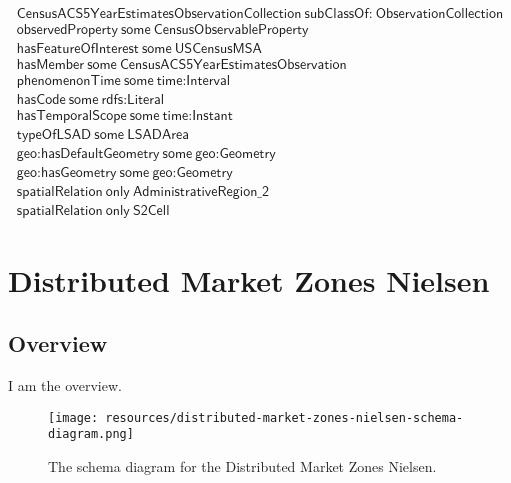 \begin{align}
  \textsf{CensusACS5YearEstimatesObservationCollection}~\textsf{subClassOf:}~\textsf{ObservationCollection}\\
  \textsf{observedProperty}~\textsf{some}~\textsf{CensusObservableProperty}\\
  \textsf{hasFeatureOfInterest}~\textsf{some}~\textsf{USCensusMSA}\\
  \textsf{hasMember}~\textsf{some}~\textsf{CensusACS5YearEstimatesObservation}\\
  \textsf{phenomenonTime}~\textsf{some}~\textsf{time:Interval}\\
  \textsf{hasCode}~\textsf{some}~\textsf{rdfs:Literal}\\
  \textsf{hasTemporalScope}~\textsf{some}~\textsf{time:Instant}\\
  \textsf{typeOfLSAD}~\textsf{some}~\textsf{LSADArea}\\
  \textsf{geo:hasDefaultGeometry}~\textsf{some}~\textsf{geo:Geometry}\\
  \textsf{geo:hasGeometry}~\textsf{some}~\textsf{geo:Geometry}\\
  \textsf{spatialRelation}~\textsf{only}~\textsf{AdministrativeRegion\_2}\\
  \textsf{spatialRelation}~\textsf{only}~\textsf{S2Cell}\end{align}



\section{Distributed Market Zones Nielsen}
\label{sec:distributed-market-zones-nielsen}
\subsection{Overview}
\label{ssec:overview}

I am the overview.

\begin{figure}[h!]
  \begin{center}
    \texttt{[image: resources/distributed-market-zones-nielsen-schema-diagram.png]}
  \end{center}
  \caption{The schema diagram for the Distributed Market Zones Nielsen.}
  \label{fig:ov-diagram}
\end{figure}


